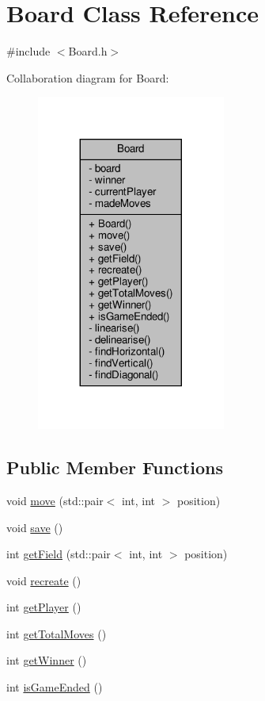 \hypertarget{classBoard}{}\section{Board Class Reference}
\label{classBoard}


{\ttfamily \#include $<$Board.\+h$>$}



Collaboration diagram for Board\+:
\nopagebreak
\begin{figure}[H]
\begin{center}
\leavevmode
\includegraphics[width=176pt]{classBoard__coll__graph}
\end{center}
\end{figure}
\subsection*{Public Member Functions}
\begin{DoxyCompactItemize}
\item 
void \hyperlink{classBoard_a5ee56f4407f7792fe6f134a59d4af190}{move} (std\+::pair$<$ int, int $>$ position)
\item 
void \hyperlink{classBoard_afc8625b4719496080a988c294869d56a}{save} ()
\item 
int \hyperlink{classBoard_a2e57d7f5e62b0d870fb3ff1b76eb18ba}{get\+Field} (std\+::pair$<$ int, int $>$ position)
\item 
void \hyperlink{classBoard_aadae139aa7b1d53e7f9ae0ae0768f417}{recreate} ()
\item 
int \hyperlink{classBoard_ad4322f41e87c8a8a99e3424fb2a2a1ec}{get\+Player} ()
\item 
int \hyperlink{classBoard_aedc0672dfb6bddabc1c1cf091b483cbb}{get\+Total\+Moves} ()
\item 
int \hyperlink{classBoard_adef3bc4bb22a2f54b7703ceff15aea5b}{get\+Winner} ()
\item 
int \hyperlink{classBoard_afadc1ddff22c3a2ee25cad41ed7e5da0}{is\+Game\+Ended} ()
\end{DoxyCompactItemize}
